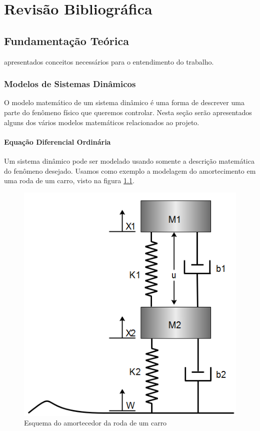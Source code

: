 \chapter{Revisão Bibliográfica} \label{cap2}

	
\section{Fundamentação Teórica}
 apresentados conceitos necessários para o entendimento do trabalho. 


\subsection{Modelos de Sistemas Dinâmicos}\label{capA}
O modelo matemático de um sistema dinâmico é uma forma de descrever uma parte do fenômeno físico que queremos controlar. Nesta seção serão apresentados alguns dos vários modelos matemáticos relacionados ao projeto.
\subsubsection{Equação Diferencial Ordinária}
Um sistema dinâmico pode ser modelado usando somente a descrição matemática do fenômeno desejado. Usamos como exemplo a modelagem do amortecimento em uma roda de um carro, visto na figura \ref{fig:modeloamortecimento}.

\begin{figure}
	\centering
	\includegraphics[width=0.5\linewidth]{modelo_amortecimento}
	\caption{Esquema do amortecedor da roda de um carro}
	\label{fig:modeloamortecimento}
\end{figure}

